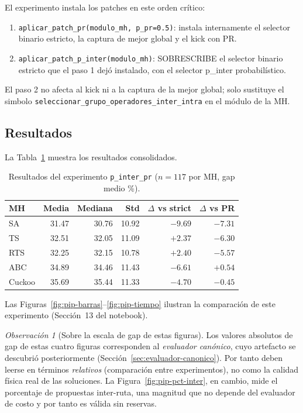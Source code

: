 \documentclass[11pt,a4paper]{article}
\theoremstyle{definition}
\theoremstyle{remark}
\newtheorem{observacion}[teorema]{Observación}
\begin{document}
El experimento instala los patches en este orden crítico:

\begin{enumerate}
\item \texttt{aplicar\_patch\_pr(modulo\_mh, p\_pr=0.5)}: instala
  internamente el selector binario estricto, la captura de mejor
  global y el kick con PR.
\item \texttt{aplicar\_patch\_p\_inter(modulo\_mh)}: SOBRESCRIBE el
  selector binario estricto que el paso 1 dejó instalado, con el
  selector p\_inter probabilístico.
\end{enumerate}

El paso 2 no afecta al kick ni a la captura de la mejor global; solo
sustituye el simbolo
\texttt{seleccionar\_grupo\_operadores\_inter\_intra} en el módulo de
la MH.

\subsection{Resultados}

La Tabla~\ref{tab:pip-resultados} muestra los resultados consolidados.

\begin{table}[h]
\centering
\caption{Resultados del experimento \texttt{p\_inter\_pr} ($n=117$ por MH, gap medio \%).}
\label{tab:pip-resultados}
\small
\begin{tabular}{lrrrrr}
\toprule
MH & Media & Mediana & Std & $\Delta$ vs strict & $\Delta$ vs PR \\
\midrule
SA      & 31.47 & 30.76 & 10.92 & $-9.69$ & $-7.31$ \\
TS      & 32.51 & 32.05 & 11.09 & $+2.37$ & $-6.30$ \\
RTS     & 32.25 & 32.15 & 10.78 & $+2.40$ & $-5.57$ \\
ABC     & 34.89 & 34.46 & 11.43 & $-6.61$ & $+0.54$ \\
Cuckoo  & 35.69 & 35.44 & 11.33 & $-4.70$ & $-0.45$ \\
\bottomrule
\end{tabular}
\end{table}

Las Figuras~\ref{fig:pip-barras}--\ref{fig:pip-tiempo} ilustran la
comparación de este experimento (Sección~13 del notebook).

\begin{observacion}[Sobre la escala de gap de estas figuras]
Los valores absolutos de gap de estas cuatro figuras corresponden al
\emph{evaluador canónico}, cuyo artefacto se descubrió posteriormente
(Sección~\ref{sec:evaluador-canonico}). Por tanto deben leerse en
términos \emph{relativos} (comparación entre experimentos), no como la
calidad física real de las soluciones. La Figura~\ref{fig:pip-pct-inter},
en cambio, mide el porcentaje de propuestas inter-ruta, una magnitud que
no depende del evaluador de costo y por tanto es válida sin reservas.
\end{observacion}
\end{document}
